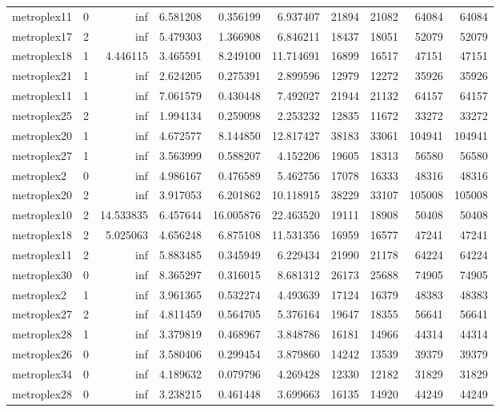\begin{longtable}{|l|r|r|r|r|r|r|r|r|r|}
metroplex11 & 0 & inf & 6.581208 & 0.356199 & 6.937407 & 21894 & 21082 & 64084 & 64084 \\
metroplex17 & 2 & inf & 5.479303 & 1.366908 & 6.846211 & 18437 & 18051 & 52079 & 52079 \\
metroplex18 & 1 & 4.446115 & 3.465591 & 8.249100 & 11.714691 & 16899 & 16517 & 47151 & 47151 \\
metroplex21 & 1 & inf & 2.624205 & 0.275391 & 2.899596 & 12979 & 12272 & 35926 & 35926 \\
metroplex11 & 1 & inf & 7.061579 & 0.430448 & 7.492027 & 21944 & 21132 & 64157 & 64157 \\
metroplex25 & 2 & inf & 1.994134 & 0.259098 & 2.253232 & 12835 & 11672 & 33272 & 33272 \\
metroplex20 & 1 & inf & 4.672577 & 8.144850 & 12.817427 & 38183 & 33061 & 104941 & 104941 \\
metroplex27 & 1 & inf & 3.563999 & 0.588207 & 4.152206 & 19605 & 18313 & 56580 & 56580 \\
metroplex2 & 0 & inf & 4.986167 & 0.476589 & 5.462756 & 17078 & 16333 & 48316 & 48316 \\
metroplex20 & 2 & inf & 3.917053 & 6.201862 & 10.118915 & 38229 & 33107 & 105008 & 105008 \\
metroplex10 & 2 & 14.533835 & 6.457644 & 16.005876 & 22.463520 & 19111 & 18908 & 50408 & 50408 \\
metroplex18 & 2 & 5.025063 & 4.656248 & 6.875108 & 11.531356 & 16959 & 16577 & 47241 & 47241 \\
metroplex11 & 2 & inf & 5.883485 & 0.345949 & 6.229434 & 21990 & 21178 & 64224 & 64224 \\
metroplex30 & 0 & inf & 8.365297 & 0.316015 & 8.681312 & 26173 & 25688 & 74905 & 74905 \\
metroplex2 & 1 & inf & 3.961365 & 0.532274 & 4.493639 & 17124 & 16379 & 48383 & 48383 \\
metroplex27 & 2 & inf & 4.811459 & 0.564705 & 5.376164 & 19647 & 18355 & 56641 & 56641 \\
metroplex28 & 1 & inf & 3.379819 & 0.468967 & 3.848786 & 16181 & 14966 & 44314 & 44314 \\
metroplex26 & 0 & inf & 3.580406 & 0.299454 & 3.879860 & 14242 & 13539 & 39379 & 39379 \\
metroplex34 & 0 & inf & 4.189632 & 0.079796 & 4.269428 & 12330 & 12182 & 31829 & 31829 \\
metroplex28 & 0 & inf & 3.238215 & 0.461448 & 3.699663 & 16135 & 14920 & 44249 & 44249 \\

\end{longtable}
